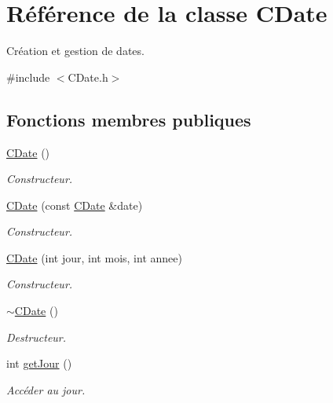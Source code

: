 \hypertarget{class_c_date}{
\section{Référence de la classe CDate}
\label{class_c_date}
}


Création et gestion de dates.  




{\ttfamily \#include $<$CDate.h$>$}

\subsection*{Fonctions membres publiques}
\begin{DoxyCompactItemize}
\item 
\hyperlink{class_c_date_abaab9d809338418c9a749ce479fcea61}{CDate} ()
\begin{DoxyCompactList}\small\item\em Constructeur. \item\end{DoxyCompactList}\item 
\hyperlink{class_c_date_ad4cd3f57aa3dd701ffb1e57753f73a6a}{CDate} (const \hyperlink{class_c_date}{CDate} \&date)
\begin{DoxyCompactList}\small\item\em Constructeur. \item\end{DoxyCompactList}\item 
\hyperlink{class_c_date_a674c65d8051308ba639825a012f20eb9}{CDate} (int jour, int mois, int annee)
\begin{DoxyCompactList}\small\item\em Constructeur. \item\end{DoxyCompactList}\item 
\hyperlink{class_c_date_a27cb391423bff726cd1a9b1bed10eea9}{$\sim$CDate} ()
\begin{DoxyCompactList}\small\item\em Destructeur. \item\end{DoxyCompactList}\item 
int \hyperlink{class_c_date_a1b2130af68061448ba2f2eff741570ac}{getJour} ()
\begin{DoxyCompactList}\small\item\em Accéder au jour. \item\end{DoxyCompactList}\item 

\end{DoxyCompactItemize}
